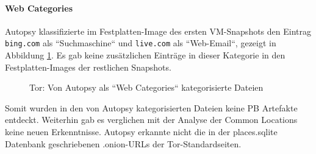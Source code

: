 \begin{appendices}
\paragraph*{Web Categories}
Autopsy klassifizierte im Festplatten-Image des ersten VM-Snapshots den Eintrag \texttt{bing.com} als ``Suchmaschine``  und \texttt{live.com} als ``Web-Email``, gezeigt in Abbildung \ref{img:tor-web-categories}.
Es gab keine zusätzlichen Einträge in dieser Kategorie in den Festplatten-Images der restlichen Snapshots.
\begin{figure}[h!]
	\centerline{} 
	\caption{Tor: Von Autopsy als ``Web Categories`` kategorisierte Dateien}
	\label{img:tor-web-categories} 
\end{figure}
		
Somit wurden in den von Autopsy kategorisierten Dateien keine PB Artefakte entdeckt. Weiterhin gab es verglichen mit der Analyse der Common Locations keine neuen Erkenntnisse. Autopsy erkannte nicht die in der places.sqlite Datenbank geschriebenen .onion-URLs der Tor-Standardseiten.



\end{appendices}
